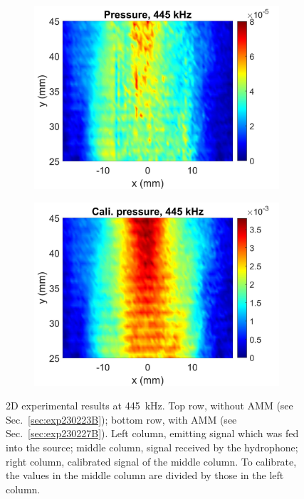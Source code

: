 \documentclass{article}
\begin{document}
\begin{figure}[!htb]
\begin{subfigure}{0.32\textwidth}
        \centering
        \includegraphics[width = \textwidth]{../../matlab/exp/fig/AnalyzeData_230227D_Exp230227B_RecPrs.jpg}
        \caption{}
    \end{subfigure}
    \begin{subfigure}{0.32\textwidth}
        \centering
        \includegraphics[width = \textwidth]{../../matlab/exp/fig/AnalyzeData_230227D_Exp230227B_CaliRecPrs.jpg}
        \caption{}
    \end{subfigure}
    \caption{2D experimental results at 445~kHz.
        Top row, without AMM (see Sec.~\ref{sec:exp230223B}); bottom row, with AMM (see Sec.~\ref{sec:exp230227B}).
        Left column, emitting signal which was fed into the source; 
        middle column, signal received by the hydrophone;
        right column, calibrated signal of the middle column.
    To calibrate, the values in the middle column are divided by those in the left column.
    }
    \label{fig:39:f020390}
\end{figure}
\end{document}
